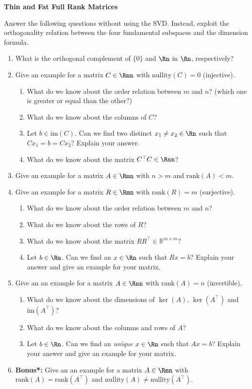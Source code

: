 \textbf{\normalsize Thin and Fat Full Rank Matrices}

Answer the following questions without using the SVD. Instead, exploit the orthogonality relation between the four fundamental subspaces and the dimension formula.
\begin{enumerate}
	\item  What is the orthogonal complement of $\{0\}$ and  $\Rn$ in $\Rn$, respectively?
	\item Give an example for a matrix $C \in \Rmn$ with $\text{nullity}(C)=0$ (injective).
	\begin{enumerate}
		\item  What do we know about the order relation between $m$ and $n$?  (which one is greater or equal than the other?)
		\item  What do we know about the columns of $C$?		
		\item  Let $b\in \text{im}(C)$. Can we find two distinct $x_1\neq x_2 \in \Rn$ such that $Cx_1=b = Cx_2 $? Explain your answer.
		\item  What do we know about the matrix $C^\top C \in \Rnn$?
	\end{enumerate}
	\item Give an example for a matrix $A\in \Rmn$ with $n > m$ and $\text{rank}(A) < m$.
	\item Give an example for a matrix $R \in \Rmn$ with $\text{rank}(R) =m$ (surjective).
	\begin{enumerate}
		\item What do we know about the order relation between $m$ and $n$?
		\item What do we know about the rows of $R$?
		\item What do we know about the matrix $RR^\top \in \mathbb{R}^{m \times m}$?
		\item Let $b\in \Rm$. Can we find an $x \in \Rn$ such that $Rx=b$? Explain your answer and give an example for your matrix.
	\end{enumerate}
	\item  Give an an example for a matrix $A \in \Rnn$ with $\text{rank}(A) =n$ (invertible).
	\begin{enumerate}
		\item  What do we know about the dimensions of $\ker(A)$, $\ker(A^\top)$ and $\text{im}(A^\top)$?
		\item  What do we know about the columns and rows of $A$?
        \item Let $b\in \Rn$. Can we find an \textit{unique} $x \in \Rn$ such that $Ax=b$? Explain your answer and give an example for your matrix.
	\end{enumerate}
	\item  \textbf{Bonus*:} Give an an example for a matrix $A \in \Rmn$ with $\text{rank}(A) =\text{rank}(A^\top)$ and $\text{nullity}(A) \neq \text{nullity}(A^\top)$.
\end{enumerate}

 